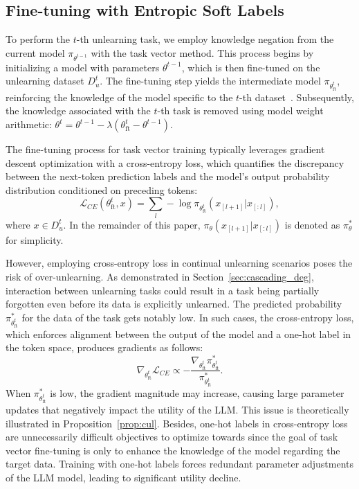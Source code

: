 \documentclass{article}
\theoremstyle{plain}
\theoremstyle{definition}
\theoremstyle{remark}
\begin{document}
\subsection{Fine-tuning with Entropic Soft Labels}
\label{sec:ESL}



To perform the $t$-th unlearning task, we employ knowledge negation from the current model $\pi_{\theta^{t-1}}$ with the task vector method.
This process begins by initializing a model with parameters $\theta^{t-1}$, which is then fine-tuned on the unlearning dataset $D_u^t$. The fine-tuning step yields the intermediate model $\pi_{\theta^t_\text{ft}}$, reinforcing the knowledge of the model specific to the $t$-th dataset~\cite{DBLP:conf/iclr/IlharcoRWSHF23}.
Subsequently, the knowledge associated with the $t$-th task is removed using model weight arithmetic: $\theta^{t}=\theta^{t-1}-\lambda(\theta_{\text{ft}}^{t}-\theta^{t-1})$.


The fine-tuning process for task vector training typically leverages gradient descent optimization with a cross-entropy loss, which quantifies the discrepancy between the next-token prediction labels and the model’s output probability distribution conditioned on preceding tokens:
\begin{equation}
	\mathcal{L}_{CE}(\theta^t_\text{ft}, x)=\sum_{l}-\log{\pi_{\theta^t_\text{ft}}(x_{[l+1]}|x_{[:l]})},
\end{equation}
where $x \in D_u^t$. In the remainder of this paper, $\pi_{\theta}(x_{[l+1]}|x_{[:l]})$ is denoted as $\pi_{\theta}^*$ for simplicity.

However, employing cross-entropy loss in continual unlearning scenarios poses the risk of over-unlearning.
As demonstrated in Section~\ref{sec:cascading_deg}, interaction between unlearning tasks could result in a task being partially forgotten even before its data is explicitly unlearned.
The predicted probability $\pi_{\theta_{\text{ft}}^t}^*$ for the data of the task gets notably low.
In such cases, the cross-entropy loss, which enforces alignment between the output of the model and a one-hot label in the token space, produces gradients as follows:
\begin{equation}
	\nabla_{\theta_{\text{ft}}^t}\mathcal{L}_{CE}\propto -\frac{\nabla_{\theta_{\text{ft}}^t}\pi_{\theta_{\text{ft}}^t}^*}{\pi_{\theta_{\text{ft}}^t}^*}.
\end{equation}
When $\pi_{\theta_{\text{ft}}^t}^*$ is low, the gradient magnitude may increase, causing large parameter updates that negatively impact the utility of the LLM.
This issue is theoretically illustrated in Proposition~\ref{prop:cul}.
Besides, one-hot labels in cross-entropy loss are unnecessarily difficult objectives to optimize towards since the goal of task vector fine-tuning is only to enhance the knowledge of the model regarding the target data.
Training with one-hot labels forces redundant parameter adjustments of the LLM model, leading to significant utility decline.
\end{document}
